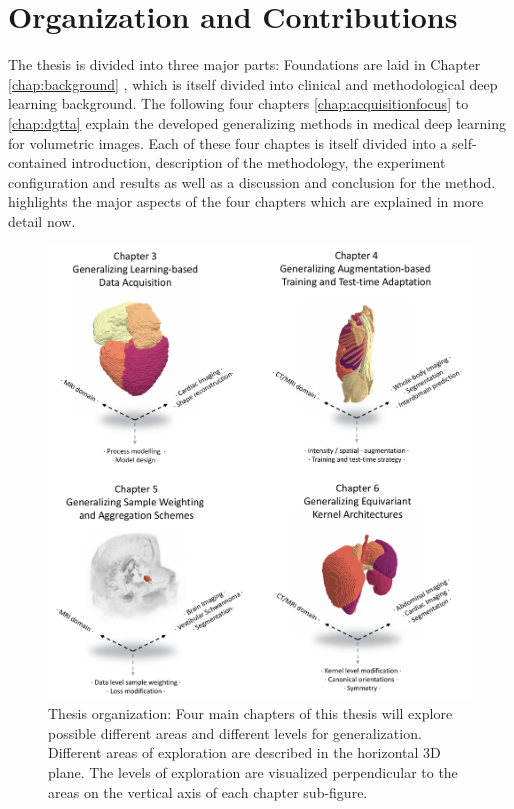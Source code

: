         \section{Organization and Contributions}  %
            \label{sec:organization}
            The thesis is divided into three major parts:
            Foundations are laid in Chapter \ref{chap:background} , which is itself divided into clinical and methodological deep learning background.
            The following four chapters \ref{chap:acquisitionfocus} to  \ref{chap:dgtta} explain the developed generalizing methods in medical deep learning for volumetric images. Each of these four chaptes is itself divided into a self-contained introduction, description of the methodology, the experiment configuration and results as well as a discussion and conclusion for the method. %
             highlights the major aspects of the four chapters which are explained in more detail now.

            \begin{figure}
                \includegraphics[width=\textwidth]{sections/01_introduction/figures/draft_areas_levels.pdf}
                \caption{Thesis organization: Four main chapters of this thesis will explore possible different areas and different levels for generalization. Different areas of exploration are described in the horizontal 3D plane. The levels of exploration are visualized perpendicular to the areas on the vertical axis of each chapter sub-figure.}
                \label{fig:draft}
            \end{figure}


